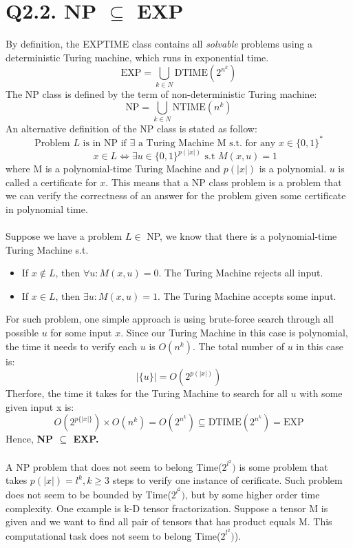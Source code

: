 \documentclass[a4paper,12pt]{article}
\begin{document}
\section*{Q2.2. NP $\subseteq$ EXP}
\noindent
By definition, the EXPTIME class contains all \emph{solvable} problems using a deterministic Turing machine, which runs in exponential time.
$$ \mbox{EXP} = \bigcup_{k \in N} \mbox{DTIME} (2^{n^k}) $$
The NP class is defined by the term of non-deterministic Turing machine:
$$ \mbox{NP} = \bigcup_{k \in N} \mbox{NTIME} (n^k) $$
An alternative definition of the NP class is stated as follow:
$$ \mbox{Problem } L \mbox{ is in NP if } \exists \mbox{ a Turing Machine M s.t.\ for any } x \in \{0,1\}^{*}$$
$$ \ \ \ \ \ \ x \in L \Leftrightarrow \exists u \in \{0,1\}^{p(|x|)} \mbox{ s.t } M(x,u) = 1$$
where M is a polynomial-time Turing Machine and $p(|x|)$ is a polynomial. $u$ is called a certificate for $x$. This means that a NP class problem is a problem that we can verify the correctness of an answer for the problem given some certificate in polynomial time. 
\paragraph{}Suppose we have a problem $L \in$ NP, we know that there is a polynomial-time Turing Machine s.t.
\begin{itemize}
    \item If $x \notin L \mbox{, then } \forall u : M(x,u) = 0$. The Turing Machine rejects all input.
    \item If $x \in L \mbox{, then } \exists u : M(x,u) = 1$. The Turing Machine accepts some input.
\end{itemize}
For such problem, one simple approach is using brute-force search through all possible $u$ for some input $x$. Since our Turing Machine in this case is polynomial, the time it needs to verify each $u$ is $O(n^k)$. The total number of $u$ in this case is: 
$$ |\{u\}| = O(2^{p(|x|)}) $$
Therfore, the time it takes for the Turing Machine to search for all $u$ with some given input x is: 
$$ O(2^{p\{|x|\}}) \times O(n^k) = O(2^{n^k}) \subseteq \mbox{DTIME}(2^{n^k}) = \mbox{EXP} $$
Hence, \textbf{NP $\boldsymbol{\subseteq}$ EXP.} 
\paragraph{}A NP problem that does not seem to belong Time($2^{l^2})$ is some problem that takes $p(|x|) = l^k, k \geq 3$ steps to verify one instance of cerificate. Such problem does not seem to be bounded by Time($2^{l^2})$, but by some higher order time complexity. One example is k-D tensor fractorization. Suppose a tensor M is given and we want to find all pair of tensors that has product equals M. This computational task does not seem to belong Time($2^{l^2})$).
\end{document}
